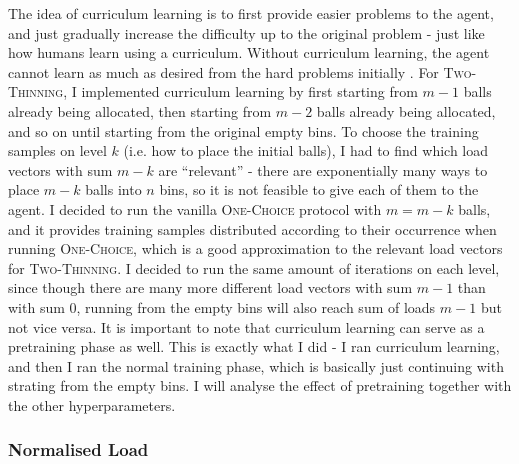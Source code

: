 The idea of curriculum learning \cite{bengio2009curriculumoriginal} is to first provide easier problems to the agent, and just gradually increase the difficulty up to the original problem - just like how humans learn using a curriculum. Without curriculum learning, the agent cannot learn as much as desired from the hard problems initially . For \textsc{Two-Thinning}, I implemented curriculum learning by first starting from $m-1$ balls already being allocated, then starting from $m-2$ balls already being allocated, and so on until starting from the original empty bins. To choose the training samples on level $k$ (i.e. how to place the initial balls), I had to find which load vectors with sum $m-k$ are ``relevant'' - there are exponentially many ways to place $m-k$ balls into $n$ bins, so it is not feasible to give each of them to the agent. I decided to run the vanilla \textsc{One-Choice} protocol with $m=m-k$ balls, and it provides training samples distributed according to their occurrence when running \textsc{One-Choice}, which is a good approximation to the relevant load vectors for \textsc{Two-Thinning}. I decided to run the same amount of iterations on each level, since though there are many more different load vectors with sum $m-1$ than with sum $0$, running from the empty bins will also reach sum of loads $m-1$ but not vice versa. It is important to note that curriculum learning can serve as a pretraining phase as well. This is exactly what I did - I ran curriculum learning, and then I ran the normal training phase, which is basically just continuing with strating from the empty bins. I will analyse the effect of pretraining together with the other hyperparameters.




\subsubsection{Normalised Load}


